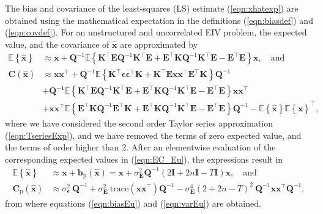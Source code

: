 The bias and covariance of the least-squares (LS) estimate (\ref{eqn:xhatexp}) are obtained using the mathematical expectation in the definitions (\ref{eqn:biasdef}) and (\ref{eqn:covdef}).
For an unstructured and uncorrelated EIV problem, the expected value, and the covariance of $\widehat{\mathbf{x}}$ are approximated by
\begin{equation} \begin{aligned} \mathbb{E} \left\{ \widehat{\mathbf{x}} \right\} & \approx \mathbf{x}  + \mathbf{Q}^{-1} \mathbb{E} \left\{ \mathbf{K}^\top \mathbf{E} \mathbf{Q}^{-1} \mathbf{K}^\top \mathbf{E} + \mathbf{E}^\top \mathbf{K} \mathbf{Q}^{-1} \mathbf{K}^\top \mathbf{E} - \mathbf{E}^\top \mathbf{E}  \right\} \mathbf{x}, \quad \text{and}  \\ 
\mathbf{C} \left( \widehat{\mathbf{x}} \right)  & \approx \mathbf{x} \mathbf{x}^\top + \mathbf{Q}^{-1} \mathbb{E} \left\{ \mathbf{K}^\top \bm{\epsilon} \bm{\epsilon}^\top \mathbf{K} + \mathbf{K}^\top \mathbf{E} \mathbf{x} \mathbf{x}^\top \mathbf{E}^\top \mathbf{K} \right\} \mathbf{Q}^{-1} \\ 
& + \mathbf{Q}^{-1} \mathbb{E} \left\{ \mathbf{K}^\top \mathbf{E} \mathbf{Q}^{-1} \mathbf{K}^\top \mathbf{E} + \mathbf{E}^\top \mathbf{K} \mathbf{Q}^{-1} \mathbf{K}^\top \mathbf{E} - \mathbf{E}^\top \mathbf{E} \right\} \mathbf{x} \mathbf{x}^\top \\
& + \mathbf{x} \mathbf{x}^\top \mathbb{E} \left\{ \mathbf{E}^\top \mathbf{K} \mathbf{Q}^{-1} \mathbf{E}^\top \mathbf{K} + \mathbf{E}^\top \mathbf{K} \mathbf{Q}^{-1} \mathbf{K}^\top \mathbf{E} - \mathbf{E}^\top \mathbf{E} \right\} \mathbf{Q}^{-1} - \mathbb{E} \left\{ \widehat{\mathbf{x}} \right\} \mathbb{E} \left\{ \widehat{\mathbf{x}} \right\}^\top , \label{eqn:EC_Eu} \end{aligned} \end{equation} 
where we have considered the second order Taylor series approximation (\ref{eqn:TseriesExp}), and we have removed the terms of zero expected value, and the terms of order higher than 2.
After an elementwise evaluation of the corresponding expected values in (\ref{eqn:EC_Eu}), the expressions result in 
\begin{equation} \begin{aligned} \mathbb{E} \left\{ \widehat{\mathbf{x}} \right\} & \approx \mathbf{x}  + \mathbf{b}_{\mathrm{p}} \left( \widehat{\mathbf{x}} \right) = \mathbf{x}  +  \sigma_{\mathbf{E}}^2 \mathbf{Q}^{-1} \left( 2\mathbf{I} + 2n\mathbf{I} - T \mathbf{I} \right) \mathbf{x} , \quad \text{and} \\ 
\mathbf{C}_{\mathrm{p}} \left( \widehat{\mathbf{x}} \right) & \approx \sigma_{\bm{\epsilon}}^2 \ \mathbf{Q}^{-1} + \sigma_{\mathbf{E}}^2 \ \mathrm{trace} \left( \mathbf{x} \mathbf{x}^\top \right) \mathbf{Q}^{-1} - \sigma_{\mathbf{E}}^4 \left( 2 + 2n - T \right)^2 \ \mathbf{Q}^{-1} \mathbf{x} \mathbf{x}^\top \mathbf{Q}^{-1} , \end{aligned} \end{equation}
from where equations (\ref{eqn:biasEu}) and (\ref{eqn:varEu}) are obtained.

